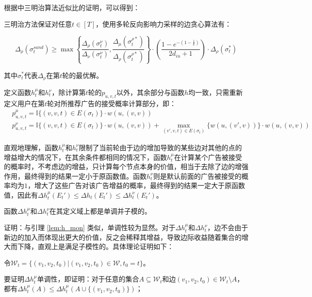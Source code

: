 根据\parencite{sandwich}中三明治算法近似比的证明，可以得到：

\begin{theorem}
\label{thm:sand}
三明治方法保证对任意$t \in [T]$，使用多轮反向影响力采样的边贪心算法有：

\begin{equation}
    \Delta_\rho(\sigma_t^{sand}) \ge \max\left\{\frac{\Delta_\rho(\sigma_t^\nu)}{\Delta_\nu(\sigma_t^\nu)},\frac{\Delta_\mu(\sigma_t^{\rho*})}{\Delta_\rho(\sigma_t^{\rho*})} \right\} \cdot (\frac{1-e^{-(1-\frac{1}{k})}}{2d_{in}+1})\cdot \Delta_\rho(\sigma_t^{*})
\end{equation}
\end{theorem}

\noindent 其中$\sigma_t^{*}$代表$\Delta_\rho$在第$t$轮的最优解。

定义函数$h_t^\mu$和$h_t^\nu$，除计算第$t$轮的$p_{u,v,t}$以外，其余部分与函数$h$均一致，只需重新定义用户在第$t$轮对所推荐广告的接受概率计算部分，即：
\begin{align}
    &p_{u,v,t}^\mu=\mathbb{I}\{(v,v,t)\in E(\sigma_t)\}\cdot w(u,(v,v)) \label{equ:def_mu}\\
    &p_{u,v,t}^\nu=\mathbb{I}\{(v,v,t)\in E(\sigma_t)\}\cdot w(u,(v,v)) + \max_{(v',v,t)\in E(\sigma_t)}\{w(u,(v',v))\}\cdot w(u,(v,v)) \label{equ:def_nu}
\end{align}

直观地理解，函数$h_t^\mu$和$h_t^\nu$限制了当前轮由于边的增加导致的某些边对其他的点的增益增大的情况下，在其余条件都相同的情况下，函数$h_t^\mu$在计算某个广告被接受的概率时，不考虑边的增益，只计算每个节点本身的价值，相当于去除了边的增强作用，最终得到的结果一定小于原函数值。函数$h_t^\nu$则是默认前面的广告被接受的概率均为$1$，增大了这些广告对该广告增益的概率，最终得到的结果一定大于原函数值，因此有$\Delta h_t^\mu(E_t') \le \Delta h_t(E_t') \le \Delta h_t^\nu(E_t')$。

\begin{lemma}
\label{lem:mon_sub}
函数$\Delta h_t^\mu$和$ \Delta h_t^\nu$在其定义域上都是单调并子模的。
\end{lemma}

\noindent 证明：与引理 \ref{lem:h_mon} 类似，单调性较为显然。对于$\Delta h_t^\mu$和$ \Delta h_t^\nu$，边不会由于新边的加入而体现出更大的价值，反之会稀释其增益，导致边际收益随着集合的增大而下降，直观上是满足子模性的。具体理论证明如下：

令$\mathcal{W}_t=\{(v_1,v_2,t_0) |(v_1,v_2,t_0) \in \mathcal{W},t_0=t\}$。

要证明$\Delta h_t^\mu$单调性，即证明：对于任意的集合$A \subseteq \mathcal{W}_t$和边$(v_1,v_2,t_0) \in \mathcal{W}_t\setminus A$，都有$\Delta h_t^\mu(A)\le \Delta h_t^\mu(A\cup\{(v_1,v_2,t_0)\})$；

